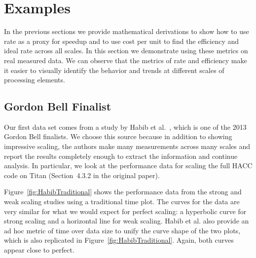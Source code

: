 \documentclass{llncs}
\newcommand*{\scite}[1]{~\cite{#1}}
\newcommand{\etal}{et al.\xspace}
\begin{document}



\section{Examples}

\noindent
In the previous sections we provide mathematical derivations to show how
to use rate as a proxy for speedup and to use cost per unit to find the
efficiency and ideal rate across all scales. In this section we demonstrate
using these metrics on real measured data. We can observe that the metrics
of rate and efficiency make it easier to visually identify the behavior and
trends at different scales of processing elements.

\subsection{Gordon Bell Finalist}

\noindent
Our first data set comes from a study by Habib \etal\scite{Habib2013}, which is
one of the 2013 Gordon Bell finalists. We choose this source because in
addition to showing impressive scaling, the authors make many measurements
across many scales and report the results completely enough to extract the
information and continue analysis. In particular, we look at the
performance data for scaling the full HACC code on Titan (Section~4.3.2 in
the original paper).

Figure~\ref{fig:HabibTraditional} shows the performance data from the
strong and weak scaling studies using a traditional time plot. The curves
for the data are very similar for what we would expect for perfect scaling:
a hyperbolic curve for strong scaling and a horizontal line for weak
scaling. Habib \etal also provide an ad hoc metric of time over data size
to unify the curve shape of the two plots, which is also replicated in
Figure~\ref{fig:HabibTraditional}. Again, both curves appear close to
perfect.
\end{document}
